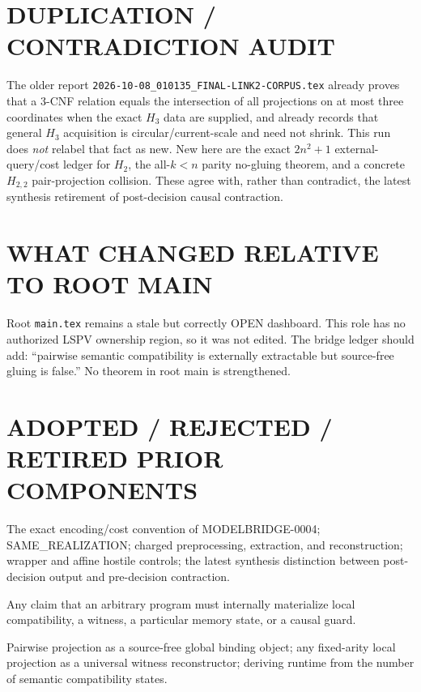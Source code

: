 \documentclass[11pt]{article}
\begin{document}
\section{DUPLICATION / CONTRADICTION AUDIT}
The older report \texttt{2026-10-08\_010135\_FINAL-LINK2-CORPUS.tex} already proves that a 3-CNF relation equals the intersection of all projections on at most three coordinates when the exact $H_3$ data are supplied, and already records that general $H_3$ acquisition is circular/current-scale and need not shrink.  This run does \emph{not} relabel that fact as new.  New here are the exact $2n^2+1$ external-query/cost ledger for $H_2$, the all-$k<n$ parity no-gluing theorem, and a concrete $H_{2,2}$ pair-projection collision.  These agree with, rather than contradict, the latest synthesis retirement of post-decision causal contraction.

\section{WHAT CHANGED RELATIVE TO ROOT MAIN}
Root \texttt{main.tex} remains a stale but correctly OPEN dashboard.  This role has no authorized LSPV ownership region, so it was not edited.  The bridge ledger should add: ``pairwise semantic compatibility is externally extractable but source-free gluing is false.''  No theorem in root main is strengthened.

\section{ADOPTED / REJECTED / RETIRED PRIOR COMPONENTS}
\begin{description}[leftmargin=2.6cm,style=nextline]
\item[Adopted.] The exact encoding/cost convention of MODELBRIDGE-0004; SAME\_REALIZATION; charged preprocessing, extraction, and reconstruction; wrapper and affine hostile controls; the latest synthesis distinction between post-decision output and pre-decision contraction.
\item[Rejected.] Any claim that an arbitrary program must internally materialize local compatibility, a witness, a particular memory state, or a causal guard.
\item[Retired.] Pairwise projection as a source-free global binding object; any fixed-arity local projection as a universal witness reconstructor; deriving runtime from the number of semantic compatibility states.
\end{description}
\end{document}
